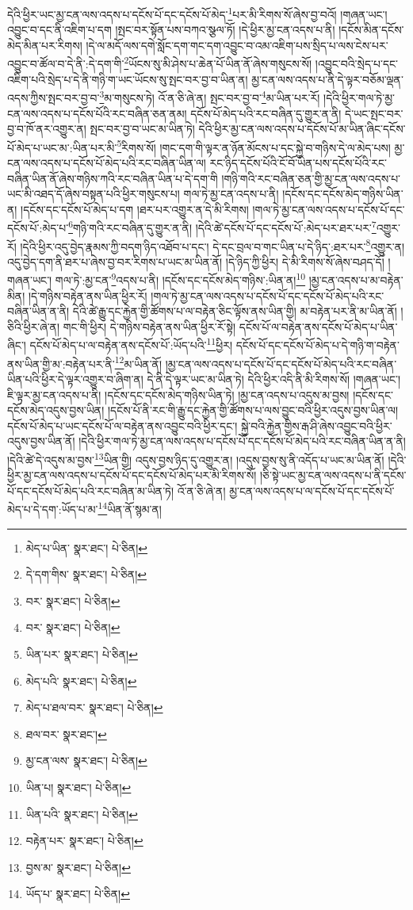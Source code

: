 དེའི་ཕྱིར་ཡང་མྱ་ངན་ལས་འདས་པ་དངོས་པོ་དང་དངོས་པོ་མེད་\footnote{མེད་པ་ཡིན་  སྣར་ཐང་།  པེ་ཅིན། }པར་མི་རིགས་སོ་ཞེས་བྱ་བའོ། །གཞན་ཡང་། འབྱུང་བ་དང་ནི་འཇིག་པ་དག །སྤང་བར་སྟོན་པས་བཀའ་སྩལ་ཏོ། །དེ་ཕྱིར་མྱ་ངན་འདས་པ་ནི། །དངོས་མིན་དངོས་མེད་མིན་པར་རིགས། །དེ་ལ་མདོ་ལས་དགེ་སློང་དག་གང་དག་འབྱུང་བ་འམ་འཇིག་པས་སྲིད་པ་ལས་ངེས་པར་འབྱུང་བ་ཚོལ་བ་དེ་ནི་:དེ་དག་གི་\footnote{དེ་དག་གིས་  སྣར་ཐང་།  པེ་ཅིན། }ཡོངས་སུ་མི་ཤེས་པ་ཆེན་པོ་ཡིན་ནོ་ཞེས་གསུངས་སོ། །འབྱུང་བའི་སྲེད་པ་དང་འཇིག་པའི་སྲེད་པ་དེ་ནི་གཉི་ག་ཡང་ཡོངས་སུ་སྤང་བར་བྱ་བ་ཡིན་ན། མྱ་ངན་ལས་འདས་པ་ནི་དེ་ལྟར་བཅོམ་ལྡན་འདས་ཀྱིས་སྤང་བར་བྱ་བ་\footnote{བར་  སྣར་ཐང་།  པེ་ཅིན། }མ་གསུངས་ཏེ། འོ་ན་ཅི་ཞེ་ན། སྤང་བར་བྱ་བ་\footnote{བར་  སྣར་ཐང་།  པེ་ཅིན། }མ་ཡིན་པར་རོ། །དེའི་ཕྱིར་གལ་ཏེ་མྱ་ངན་ལས་འདས་པ་དངོས་པོའི་རང་བཞིན་ཅན་ནམ། དངོས་པོ་མེད་པའི་རང་བཞིན་དུ་གྱུར་ན་ནི། དེ་ཡང་སྤང་བར་བྱ་བ་ཁོ་ནར་འགྱུར་ན། སྤང་བར་བྱ་བ་ཡང་མ་ཡིན་ཏེ། དེའི་ཕྱིར་མྱ་ངན་ལས་འདས་པ་དངོས་པོ་མ་ཡིན་ཞིང་དངོས་པོ་མེད་པ་ཡང་མ་:ཡིན་པར་མི་\footnote{ཡིན་པར་  སྣར་ཐང་།  པེ་ཅིན། }རིགས་སོ། །གང་དག་གི་ལྟར་ན་ཉོན་མོངས་པ་དང་སྐྱེ་བ་གཉིས་དེ་ལ་མེད་པས། མྱ་ངན་ལས་འདས་པ་དངོས་པོ་མེད་པའི་རང་བཞིན་ཡིན་ལ། རང་ཉིད་དངོས་པོའི་ངོ་བོ་ཡིན་པས་དངོས་པོའི་རང་བཞིན་ཡིན་ནོ་ཞེས་གཉིས་ཀའི་རང་བཞིན་ཡིན་པ་དེ་དག་གི །གཉི་གའི་རང་བཞིན་ཅན་གྱི་མྱ་ངན་ལས་འདས་པ་ཡང་མི་འཐད་དོ་ཞེས་བསྟན་པའི་ཕྱིར་གསུངས་པ། གལ་ཏེ་མྱ་ངན་འདས་པ་ནི། །དངོས་དང་དངོས་མེད་གཉིས་ཡིན་ན། །དངོས་དང་དངོས་པོ་མེད་པ་དག །ཐར་པར་འགྱུར་ན་དེ་མི་རིགས། །གལ་ཏེ་མྱ་ངན་ལས་འདས་པ་དངོས་པོ་དང་དངོས་པོ་:མེད་པ་\footnote{མེད་པའི་  སྣར་ཐང་།  པེ་ཅིན། }གཉི་གའི་རང་བཞིན་དུ་གྱུར་ན་ནི། །དེའི་ཚེ་དངོས་པོ་དང་དངོས་པོ་:མེད་པར་ཐར་པར་\footnote{མེད་པ་ཐལ་བར་  སྣར་ཐང་།  པེ་ཅིན། }འགྱུར་རོ། །དེའི་ཕྱིར་འདུ་བྱེད་རྣམས་ཀྱི་བདག་ཉིད་འཐོབ་པ་དང་། དེ་དང་བྲལ་བ་གང་ཡིན་པ་དེ་ཉིད་:ཐར་པར་\footnote{ཐལ་བར་  སྣར་ཐང་། }འགྱུར་ན། འདུ་བྱེད་དག་ནི་ཐར་པ་ཞེས་བྱ་བར་རིགས་པ་ཡང་མ་ཡིན་ནོ། །དེ་ཉིད་ཀྱི་ཕྱིར། དེ་མི་རིགས་སོ་ཞེས་བཤད་དོ། །གཞན་ཡང་། གལ་ཏེ་:མྱ་ངན་\footnote{མྱ་ངན་ལས་  སྣར་ཐང་།  པེ་ཅིན། }འདས་པ་ནི། །དངོས་དང་དངོས་མེད་གཉིས་:ཡིན་ན།\footnote{ཡིན་པ།  སྣར་ཐང་།  པེ་ཅིན། } །མྱ་ངན་འདས་པ་མ་བརྟེན་མིན། །དེ་གཉིས་བརྟེན་ནས་ཡིན་ཕྱིར་རོ། །གལ་ཏེ་མྱ་ངན་ལས་འདས་པ་དངོས་པོ་དང་དངོས་པོ་མེད་པའི་རང་བཞིན་ཡིན་ན་ནི། དེའི་ཚེ་རྒྱུ་དང་རྐྱེན་གྱི་ཚོགས་པ་ལ་བརྟེན་ཅིང་ལྟོས་ནས་ཡིན་གྱི། མ་བརྟེན་པར་ནི་མ་ཡིན་ནོ། །ཅིའི་ཕྱིར་ཞེ་ན། གང་གི་ཕྱིར། དེ་གཉིས་བརྟེན་ནས་ཡིན་ཕྱིར་རོ་སྟེ། དངོས་པོ་ལ་བརྟེན་ནས་དངོས་པོ་མེད་པ་ཡིན་ཞིང་། དངོས་པོ་མེད་པ་ལ་བརྟེན་ནས་དངོས་པོ་:ཡོད་པའི་\footnote{ཡིན་པའི་  སྣར་ཐང་།  པེ་ཅིན། }ཕྱིར། དངོས་པོ་དང་དངོས་པོ་མེད་པ་དེ་གཉི་ག་བརྟེན་ནས་ཡིན་གྱི་མ་:བརྟེན་པར་ནི་\footnote{བརྟེན་པར་  སྣར་ཐང་།  པེ་ཅིན། }མ་ཡིན་ནོ། །མྱ་ངན་ལས་འདས་པ་དངོས་པོ་དང་དངོས་པོ་མེད་པའི་རང་བཞིན་ཡིན་པའི་ཕྱིར་དེ་ལྟར་འགྱུར་བ་ཞིག་ན། དེ་ནི་དེ་ལྟར་ཡང་མ་ཡིན་ཏེ། དེའི་ཕྱིར་འདི་ནི་མི་རིགས་སོ། །གཞན་ཡང་། ཇི་ལྟར་མྱ་ངན་འདས་པ་ནི། །དངོས་དང་དངོས་མེད་གཉིས་ཡིན་ཏེ། །མྱ་ངན་འདས་པ་འདུས་མ་བྱས། །དངོས་དང་དངོས་མེད་འདུས་བྱས་ཡིན། །དངོས་པོ་ནི་རང་གི་རྒྱུ་དང་རྐྱེན་གྱི་ཚོགས་པ་ལས་བྱུང་བའི་ཕྱིར་འདུས་བྱས་ཡིན་ལ། དངོས་པོ་མེད་པ་ཡང་དངོས་པོ་ལ་བརྟེན་ནས་འབྱུང་བའི་ཕྱིར་དང་། སྐྱེ་བའི་རྐྱེན་གྱིས་རྒ་ཤི་ཞེས་འབྱུང་བའི་ཕྱིར་འདུས་བྱས་ཡིན་ནོ། །དེའི་ཕྱིར་གལ་ཏེ་མྱ་ངན་ལས་འདས་པ་དངོས་པོ་དང་དངོས་པོ་མེད་པའི་རང་བཞིན་ཡིན་ན་ནི། །དེའི་ཚེ་དེ་འདུས་མ་བྱས་\footnote{བྱས་མ་  སྣར་ཐང་།  པེ་ཅིན། }ཡིན་གྱི། འདུས་བྱས་ཉིད་དུ་འགྱུར་ན། །འདུས་བྱས་སུ་ནི་འདོད་པ་ཡང་མ་ཡིན་ནོ། །དེའི་ཕྱིར་མྱ་ངན་ལས་འདས་པ་དངོས་པོ་དང་དངོས་པོ་མེད་པར་མི་རིགས་སོ། །ཅི་སྟེ་ཡང་མྱ་ངན་ལས་འདས་པ་ནི་དངོས་པོ་དང་དངོས་པོ་མེད་པའི་རང་བཞིན་མ་ཡིན་ཏེ། འོ་ན་ཅི་ཞེ་ན། མྱ་ངན་ལས་འདས་པ་ལ་དངོས་པོ་དང་དངོས་པོ་མེད་པ་དེ་དག་:ཡོད་པ་མ་\footnote{ཡོད་པ་  སྣར་ཐང་།  པེ་ཅིན། }ཡིན་ནོ་སྙམ་ན། 